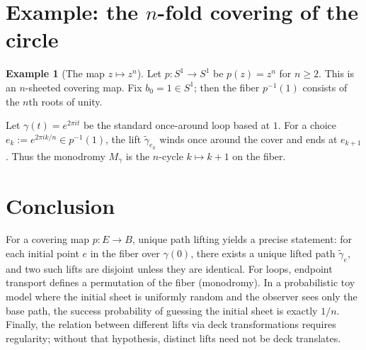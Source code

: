 \documentclass[11pt,a4paper]{article}
\theoremstyle{definition}
\newtheorem{example}[theorem]{Example}
\theoremstyle{remark}
\begin{document}
\section{Example: the \texorpdfstring{$n$}{n}-fold covering of the circle}
\label{sec:circle-example}

\begin{example}[The map \(z\mapsto z^n\)]
\label{ex:z-to-zn}
Let \(p:S^1\to S^1\) be \(p(z)=z^n\) for \(n\ge 2\). This is an \(n\)-sheeted covering map. Fix \(b_0=1\in S^1\); then the fiber \(p^{-1}(1)\) consists of the \(n\)th roots of unity.

Let \(\gamma(t)=e^{2\pi i t}\) be the standard once-around loop based at \(1\). For a choice \(e_k:=e^{2\pi i k/n}\in p^{-1}(1)\), the lift \(\tilde\gamma_{e_k}\) winds once around the cover and ends at \(e_{k+1}\). Thus the monodromy \(M_\gamma\) is the \(n\)-cycle \(k\mapsto k+1\) on the fiber.
\end{example}

\section{Conclusion}
\label{sec:conclusion}

For a covering map \(p:E\to B\), unique path lifting yields a precise statement: for each initial point \(e\) in the fiber over \(\gamma(0)\), there exists a unique lifted path \(\tilde\gamma_e\), and two such lifts are disjoint unless they are identical. For loops, endpoint transport defines a permutation of the fiber (monodromy). In a probabilistic toy model where the initial sheet is uniformly random and the observer sees only the base path, the success probability of guessing the initial sheet is exactly \(1/n\). Finally, the relation between different lifts via deck transformations requires regularity; without that hypothesis, distinct lifts need not be deck translates.



\end{document}

